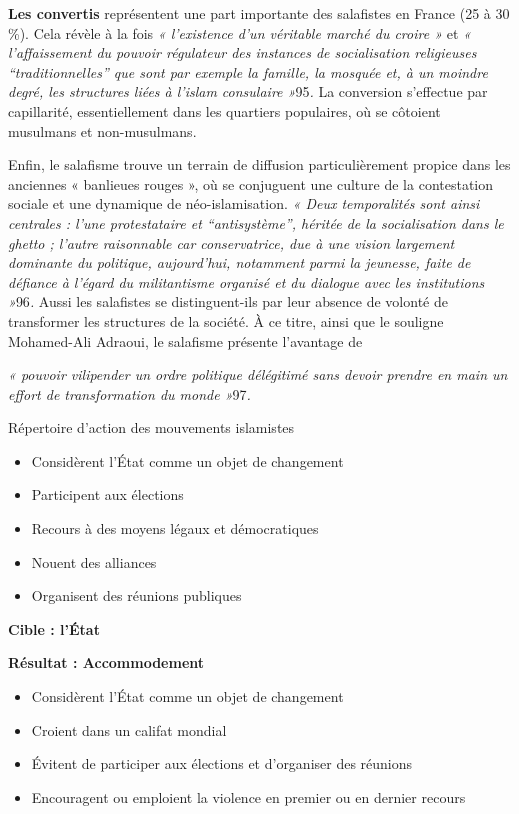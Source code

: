 \textbf{Les convertis} représentent une part importante des salafistes
en France (25 à 30 \%). Cela révèle à la fois \emph{« l'existence d'un
véritable marché du croire »} et \emph{« l'affaissement du pouvoir
régulateur des instances de socialisation religieuses
``traditionnelles'' que sont par exemple la famille, la mosquée et, à un
moindre degré, les structures liées à l'islam consulaire »}95\emph{.} La
conversion s'effectue par capillarité, essentiellement dans les
quartiers populaires, où se côtoient musulmans et non-musulmans.

Enfin, le salafisme trouve un terrain de diffusion particulièrement
propice dans les anciennes « banlieues rouges », où se conjuguent une
culture de la contestation sociale et une dynamique de néo-islamisation.
\emph{« Deux temporalités sont ainsi centrales : l'une protestataire et
``antisystème'', héritée de la socialisation dans le ghetto ; l'autre
raisonnable car conservatrice, due à une vision largement dominante du
politique, aujourd'hui, notamment parmi la jeunesse, faite de défiance à
l'égard du militantisme organisé et du dialogue avec les institutions
»}96\emph{.} Aussi les salafistes se distinguent-ils par leur absence de
volonté de transformer les structures de la société. À ce titre, ainsi
que le souligne Mohamed-Ali Adraoui, le salafisme présente l'avantage de

\emph{« pouvoir vilipender un ordre politique délégitimé sans devoir
prendre en main un effort de transformation du monde »}97\emph{.}

Répertoire d'action des mouvements islamistes

\begin{itemize}
\item
  Considèrent l'État comme un objet de changement
\item
  Participent aux élections
\item
  Recours à des moyens légaux et démocratiques
\item
  Nouent des alliances
\item
  Organisent des réunions publiques
\end{itemize}


\textbf{Cible : l'État}

\textbf{Résultat : Accommodement}


\begin{itemize}
\item
  Considèrent l'État comme un objet de changement
\item
  Croient dans un califat mondial
\item
  Évitent de participer aux élections et d'organiser des réunions
\item
  Encouragent ou emploient la violence en premier ou en dernier recours
\end{itemize}


